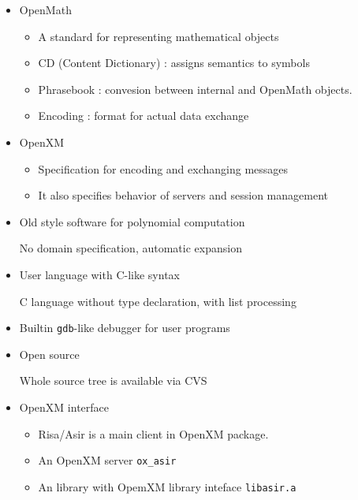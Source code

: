 \begin{slide}{}

\begin{itemize}
\item OpenMath

\begin{itemize}
\item A standard for representing mathematical objects

\item CD (Content Dictionary) : assigns semantics to symbols

\item Phrasebook : convesion between internal and OpenMath objects.

\item Encoding : format for actual data exchange
\end{itemize}

\item OpenXM

\begin{itemize}
\item Specification for encoding and exchanging messages

\item It also specifies behavior of servers and session management
\end{itemize}

\end{itemize}
\end{slide}
\begin{slide}{}

\begin{itemize}
\item Old style software for polynomial computation

No domain specification, automatic expansion

\item User language with C-like syntax

C language without type declaration, with list processing

\item Builtin {\tt gdb}-like debugger for user programs

\item Open source

Whole source tree is available via CVS

\item OpenXM interface

\begin{itemize}
\item Risa/Asir is a main client in OpenXM package.
\item An OpenXM server {\tt ox\_asir}
\item An library with OpemXM library inteface {\tt libasir.a}
\end{itemize}
\end{itemize}
\end{slide}

